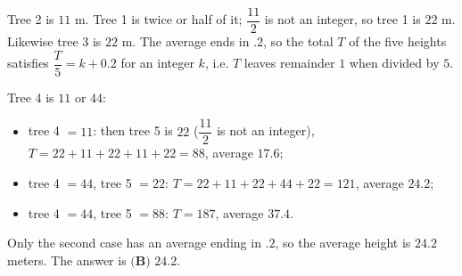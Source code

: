 Tree 2 is $11$ m. Tree 1 is twice or half of it; $\dfrac{11}2$ is not an integer, so tree 1 is $22$ m. Likewise tree 3 is $22$ m. The average ends in $.2$, so the total $T$ of the five heights satisfies $\dfrac T5=k+0.2$ for an integer $k$, i.e. $T$ leaves remainder $1$ when divided by $5$.

Tree 4 is $11$ or $44$:
\begin{itemize}
\item tree 4 $=11$: then tree 5 is $22$ ($\dfrac{11}{2}$ is not an integer), $T=22+11+22+11+22=88$, average $17.6$;
\item tree 4 $=44$, tree 5 $=22$: $T=22+11+22+44+22=121$, average $24.2$;
\item tree 4 $=44$, tree 5 $=88$: $T=187$, average $37.4$.
\end{itemize}
Only the second case has an average ending in $.2$, so the average height is $24.2$ meters. The answer is $\boxed{\textbf{(B) }24.2}$.
